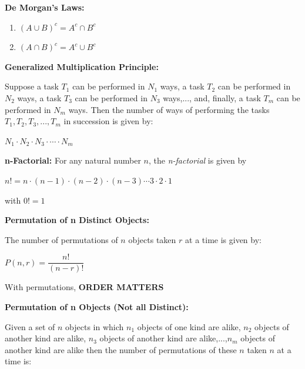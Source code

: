 \documentclass[12pt]{article}
\newenvironment{myindentpar}[1]%
     {\begin{list}{}%
             {\setlength{\leftmargin}{#1}}%
             \item[]%
     }
     {\end{list}}
\begin{document}
\vspace{.5cm}

\textbf{De Morgan's Laws:}

\begin{enumerate}
\item $(A \cup B)^{c} = A^{c} \cap B^{c}$
\item $(A \cap B)^{c} = A^{c} \cup B^{c}$
\end{enumerate}

\vspace{.5cm}

\textbf{Generalized Multiplication Principle:}

\begin{myindentpar}{2cm}
Suppose a task $T_{1}$ can be performed in $N_{1}$ ways, a task $T_{2}$ can be performed in $N_{2}$ ways, a task $T_{3}$ can be performed in $N_{3}$ ways,..., and, finally, a task $T_{m}$ can be performed in $N_{m}$ ways. Then the number of ways of performing the tasks $T_{1}, T_{2}, T_{3},...,T_{m}$ in succession is given by:
\newline

\centerline{$N_{1} \cdot N_{2} \cdot N_{3} \cdot \cdots \cdot N_{m}$}
\end{myindentpar}

\vspace{.5cm}

\textbf{n-Factorial:}
For any natural number $n$, the \textit{n-factorial} is given by
\newline

\centerline{$n! = n \cdot (n-1) \cdot (n-2) \cdot (n-3) \cdots 3 \cdot 2 \cdot 1$}

\hspace{5cm} with $0! = 1$

\vspace{.5cm}

\textbf{Permutation of n Distinct Objects:} 

The number of permutations of $n$ objects taken $r$ at a time is given by:
\newline

\centerline{$P(n,r) = \dfrac{n!}{(n-r)!}$}


With permutations, \textbf{ORDER MATTERS}

\vspace{.5cm}

\textbf{Permutation of n Objects (Not all Distinct):}

Given a set of $n$ objects in which $n_{1}$ objects of one kind are alike, $n_{2}$ objects of another kind are alike, $n_{3}$ objects of another kind are alike,...,$n_{m}$ objects of another kind are alike then the number of permutations of these $n$ taken $n$ at a time is:
\newline
\end{document}
